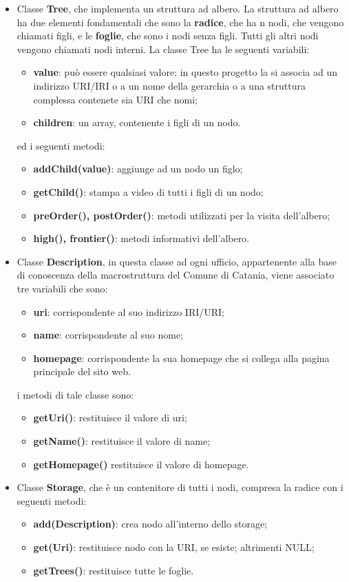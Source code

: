 \documentclass[a4paper,11pt]{article}
\begin{document}
\begin{itemize}
	\item Classe \textbf{Tree}, che implementa un struttura ad albero. La struttura ad albero ha due elementi fondamentali che sono la \textbf{radice}, che ha n nodi, che vengono chiamati figli, e le \textbf{foglie}, che sono i nodi senza figli. Tutti gli altri nodi vengono chiamati nodi interni.
La classe Tree	ha le seguenti variabili:
\begin{itemize}
	\item \textbf{value}: può essere qualsiasi valore; in questo progetto la si associa ad un indirizzo URI/IRI o a un nome della gerarchia o a una struttura complessa contenete sia URI che nomi;
	\item \textbf{children}: un array, contenente i figli di un nodo.
\end{itemize}
ed i seguenti metodi:
\begin{itemize}
	\item \textbf{addChild(value)}: aggiunge ad un nodo un figlo;
	\item \textbf{getChild()}: stampa a video di tutti i figli di un nodo;
	\item \textbf{preOrder(), postOrder()}: metodi utilizzati per la visita dell'albero;
	\item \textbf{high(), frontier()}: metodi informativi dell'albero.
\end{itemize}			
	\item Classe \textbf{Description}, in questa classe ad ogni ufficio, appartenente alla base di conoscenza della macrostruttura del Comune di Catania, viene associato tre variabili che sono:
\begin{itemize}
	\item \textbf{uri}: corrispondente al suo indirizzo IRI/URI;
	\item \textbf{name}: corrispondente al suo nome;
	\item \textbf{homepage}: corrispondente la sua homepage che si collega alla pagina principale del sito web.
\end{itemize}	
i metodi di tale classe sono:
\begin{itemize}
	\item \textbf{getUri()}: restituisce il valore di uri;
	\item \textbf{getName()}: restituisce il valore di name;
	\item \textbf{getHomepage()} restituisce il valore di homepage.
\end{itemize} 
\item Classe \textbf{Storage}, che è un contenitore di tutti i nodi, compresa la radice con i seguenti metodi:
\begin{itemize}
	\item \textbf{add(Description)}: crea nodo all'interno dello storage;
	\item \textbf{get(Uri)}: restituisce nodo con la URI, se esiste; altrimenti NULL;
	\item \textbf{getTrees()}: restituisce tutte le foglie.
\end{itemize}
\end{itemize}	
\end{document}
